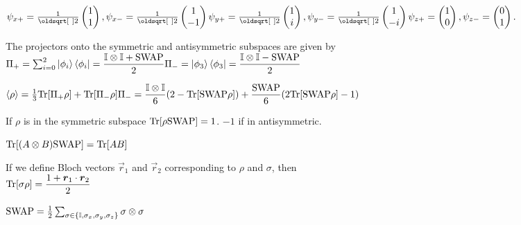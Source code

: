 $
\psi_{x+} = \frac{1}{\sqrt{2}} \begin{pmatrix} 1 \\  1 \end{pmatrix}, 
\psi_{x-} = \frac{1}{\sqrt{2}} \begin{pmatrix} 1 \\ -1 \end{pmatrix} \\
\psi_{y+} = \frac{1}{\sqrt{2}} \begin{pmatrix} 1 \\  i \end{pmatrix}, 
\psi_{y-} = \frac{1}{\sqrt{2}} \begin{pmatrix} 1 \\ -i \end{pmatrix} \\
\psi_{z+} =                  \begin{pmatrix} 1 \\  0 \end{pmatrix}, 
\psi_{z-} =                  \begin{pmatrix} 0 \\  1 \end{pmatrix}.
$

\begin{squishlist}
    \item The projectors onto the symmetric and antisymmetric subspaces are given by \\
    $\Pi_+ = \sum_{i=0}^2 \ket{\phi_i} \bra{\phi_i} = \dfrac{\mathbb{I} \otimes \mathbb{I} + \text{SWAP}}{2} \\
    \Pi_- = \ket{\phi_3} \bra{\phi_3} = \dfrac{\mathbb{I} \otimes \mathbb{I} - \text{SWAP}}{2}$

    \item $\braket{\rho} = \frac{1}{3} \mathrm{Tr}[\Pi_+ \rho] + \mathrm{Tr}[\Pi_- \rho] \Pi_- = \\
    \dfrac{\mathbb{I} \otimes \mathbb{I}}{6}(2 - \mathrm{Tr}[\text{SWAP} \rho]) + \dfrac{\text{SWAP}}{6} (2 \mathrm{Tr}[\text{SWAP} \rho] - 1)$

    \item If $\rho$ is in the symmetric subspace $\mathrm{Tr}[ \rho \text{SWAP}] = 1$. $-1$ if in antisymmetric.
    \item $\mathrm{Tr}[(A \otimes B)\text{SWAP}] = \mathrm{Tr} [AB]$
    \item If we define Bloch vectors $\vec{r}_1$ and $\vec{r}_2$ corresponding to $\rho$ and $\sigma$, then \\
    $\mathrm{Tr}[\sigma \rho] = \dfrac{1 + \mbox{\boldmath$r$}_1 \cdot \mbox{\boldmath$r$}_2}{2}$

    \item $\text{SWAP} = \frac{1}{2} \sum_{\sigma \in \{ \mathbb{I}, \sigma_x, \sigma_y, \sigma_z\}} \sigma \otimes \sigma$
\end{squishlist}

